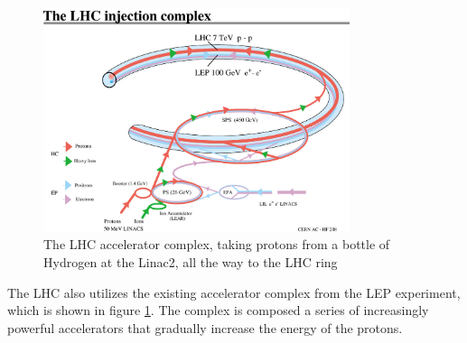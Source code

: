 \begin{figure}[h]
   \centering
  \includegraphics[width=0.8\textwidth]{Figures/LHC_Diagrams/LHC_injection_complex.jpg}
  \caption{The LHC accelerator complex, taking protons from a bottle
    of Hydrogen at the Linac2, all the way to the LHC
    ring \cite{Jean-Luc:841568}} \label{fig:lhc_accelerator_complex}
\end{figure}

\par The LHC also utilizes the existing accelerator complex from the
LEP experiment, which is shown in figure
\ref{fig:lhc_accelerator_complex}.  The complex is composed a series
of increasingly powerful accelerators that gradually increase the
energy of the protons.  

